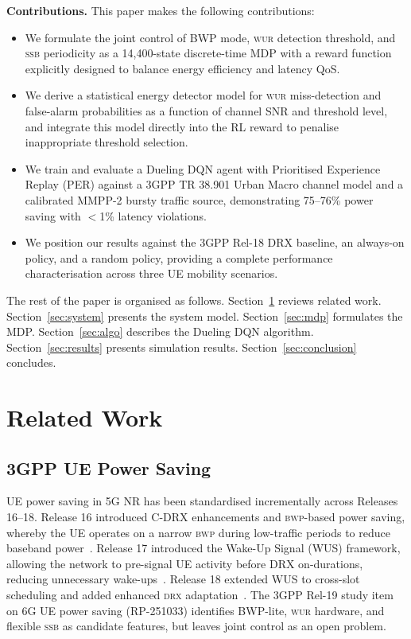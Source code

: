 \documentclass[conference]{IEEEtran}
\newcommand{\bwp}{\textsc{bwp}}
\newcommand{\wur}{\textsc{wur}}
\newcommand{\ssb}{\textsc{ssb}}
\newcommand{\drx}{\textsc{drx}}
\begin{document}
\textbf{Contributions.} This paper makes the following contributions:
\begin{itemize}
  \item We formulate the joint control of BWP mode, \wur{} detection
        threshold, and \ssb{} periodicity as a 14,400-state discrete-time
        MDP with a reward function explicitly designed to balance energy
        efficiency and latency QoS.
  \item We derive a statistical energy detector model for \wur{} miss-detection
        and false-alarm probabilities as a function of channel SNR and
        threshold level, and integrate this model directly into the RL
        reward to penalise inappropriate threshold selection.
  \item We train and evaluate a Dueling DQN agent with Prioritised
        Experience Replay (PER) against a 3GPP TR 38.901 Urban Macro
        channel model and a calibrated MMPP-2 bursty traffic source,
        demonstrating 75--76\% power saving with $<$1\% latency violations.
  \item We position our results against the 3GPP Rel-18 DRX baseline,
        an always-on policy, and a random policy, providing a complete
        performance characterisation across three UE mobility scenarios.
\end{itemize}

The rest of the paper is organised as follows.
Section~\ref{sec:related} reviews related work.
Section~\ref{sec:system} presents the system model.
Section~\ref{sec:mdp} formulates the MDP.
Section~\ref{sec:algo} describes the Dueling DQN algorithm.
Section~\ref{sec:results} presents simulation results.
Section~\ref{sec:conclusion} concludes.

\section{Related Work}
\label{sec:related}

\subsection{3GPP UE Power Saving}

UE power saving in 5G NR has been standardised incrementally across
Releases 16--18.
Release 16 introduced C-DRX enhancements and \bwp{}-based power saving,
whereby the UE operates on a narrow \bwp{} during low-traffic periods to
reduce baseband power~\cite{3gpp_ts38300}.
Release 17 introduced the Wake-Up Signal (WUS) framework, allowing
the network to pre-signal UE activity before DRX on-durations,
reducing unnecessary wake-ups~\cite{3gpp_tr38875}.
Release 18 extended WUS to cross-slot scheduling and added enhanced
\drx{} adaptation~\cite{3gpp_rel18_ps}.
The 3GPP Rel-19 study item on 6G UE power saving (RP-251033) identifies
BWP-lite, \wur{} hardware, and flexible \ssb{} as candidate features,
but leaves joint control as an open problem.
\end{document}
